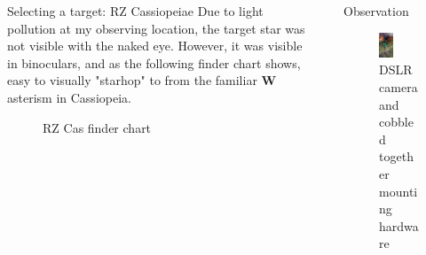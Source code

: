 \documentclass[final]{beamer}
\newlength{\sepwidth}
\newlength{\colwidth}
\newcommand{\separatorcolumn}{\begin{column}{\sepwidth}\end{column}}
\begin{document}
\begin{frame}[t]
\begin{columns}[t]
\begin{column}{\colwidth}
\begin{block}{Selecting a target: RZ Cassiopeiae}
    Due to light pollution at my observing location, the target star was not visible 
    with the naked eye. However, it was visible in binoculars, and as the following
    finder chart shows, easy to visually "starhop" to from the familiar \textbf{W} asterism
    in Cassiopeia.

    \begin{figure}
      \centering
      \caption{RZ Cas finder chart}
    \end{figure}
  \end{block}


\end{column}

\separatorcolumn

\begin{column}{\colwidth}

  \begin{block}{Observation}
    \begin{figure}
      \centering
      \includegraphics[width=0.35\textwidth]{camera_and_mount-crop.jpg}
      \caption{DSLR camera and cobbled together mounting hardware}
    \end{figure}

%


\end{block}
\end{column}
\end{columns}
\end{frame}
\end{document}
